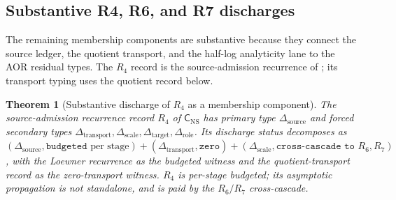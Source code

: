 \documentclass[11pt]{article}
\newtheorem{theorem}{Theorem}[section]
\theoremstyle{definition}
\begin{document}
\subsection{Substantive R4, R6, and R7 discharges}

The remaining membership components are substantive because they
connect the source ledger, the quotient transport, and the half-log
analyticity lane to the AOR residual types.  The \(R_4\) record is the
source-admission recurrence of ; its
transport typing uses the quotient record below.

\begingroup
{}
\begin{theorem}[Substantive discharge of $R_4$ as a membership component]\label{thm:ns:aor-r4-discharge}
The source-admission recurrence record $R_4$ of $\mathsf C_{\mathrm{NS}}$ has primary type $\Delta_{\mathrm{source}}$ and forced secondary types $\Delta_{\mathrm{transport}},\Delta_{\mathrm{scale}},\Delta_{\mathrm{target}},\Delta_{\mathrm{role}}$.  Its discharge status decomposes as $(\Delta_{\mathrm{source}},\texttt{budgeted}\text{ per stage})+(\Delta_{\mathrm{transport}},\texttt{zero})+(\Delta_{\mathrm{scale}},\texttt{cross-cascade to }R_6,R_7)$, with the Loewner recurrence as the budgeted witness and the quotient-transport record  as the zero-transport witness.  $R_4$ is per-stage budgeted; its asymptotic propagation is not standalone, and is paid by the $R_6/R_7$ cross-cascade.
\end{theorem}
\endgroup
\end{document}
